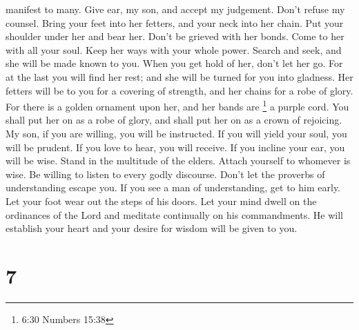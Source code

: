 manifest to many.  Give ear, my son, and accept my
judgement. Don't refuse my counsel.  Bring your feet into
her fetters, and your neck into her chain.  Put your
shoulder under her and bear her. Don't be grieved with her bonds.
 Come to her with all your soul. Keep her ways with your
whole power.  Search and seek, and she will be made known
to you. When you get hold of her, don't let her go.  For at
the last you will find her rest; and she will be turned for you into
gladness.  Her fetters will be to you for a covering of
strength, and her chains for a robe of glory.  For there is
a golden ornament upon her, and her bands are \footnote{6:30 Numbers
  15:38} a purple cord.  You shall put her on as a robe of
glory, and shall put her on as a crown of rejoicing.  My
son, if you are willing, you will be instructed. If you will yield your
soul, you will be prudent.  If you love to hear, you will
receive. If you incline your ear, you will be wise.  Stand
in the multitude of the elders. Attach yourself to whomever is wise.
 Be willing to listen to every godly discourse. Don't let
the proverbs of understanding escape you.  If you see a man
of understanding, get to him early. Let your foot wear out the steps of
his doors.  Let your mind dwell on the ordinances of the
Lord and meditate continually on his commandments. He will establish
your heart and your desire for wisdom will be given to you.

\hypertarget{section-5}{%
\section{7}\label{section-5}}

